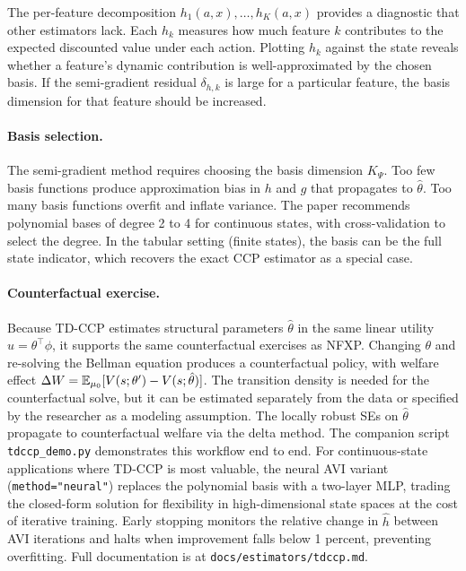 \documentclass[11pt]{article}
\begin{document}
The per-feature decomposition $h_1(a,x), \ldots, h_K(a,x)$ provides a diagnostic that other estimators lack.
Each $h_k$ measures how much feature $k$ contributes to the expected discounted value under each action.
Plotting $h_k$ against the state reveals whether a feature's dynamic contribution is well-approximated by the chosen basis.
If the semi-gradient residual $\delta_{h,k}$ is large for a particular feature, the basis dimension for that feature should be increased.

\paragraph{Basis selection.}
The semi-gradient method requires choosing the basis dimension $K_\Psi$.
Too few basis functions produce approximation bias in $h$ and $g$ that propagates to $\hat\theta$.
Too many basis functions overfit and inflate variance.
The paper recommends polynomial bases of degree 2 to 4 for continuous states, with cross-validation to select the degree.
In the tabular setting (finite states), the basis can be the full state indicator, which recovers the exact CCP estimator as a special case.

\paragraph{Counterfactual exercise.}
Because TD-CCP estimates structural parameters $\hat\theta$ in the same linear utility $u = \theta^\top\phi$, it supports the same counterfactual exercises as NFXP.
Changing $\theta$ and re-solving the Bellman equation produces a counterfactual policy, with welfare effect $\Delta W = \mathbb{E}_{\mu_0}[V(s;\theta') - V(s;\hat\theta)]$.
The transition density is needed for the counterfactual solve, but it can be estimated separately from the data or specified by the researcher as a modeling assumption.
The locally robust SEs on $\hat\theta$ propagate to counterfactual welfare via the delta method.
The companion script \texttt{tdccp\_demo.py} demonstrates this workflow end to end.
For continuous-state applications where TD-CCP is most valuable, the neural AVI variant (\texttt{method="neural"}) replaces the polynomial basis with a two-layer MLP, trading the closed-form solution for flexibility in high-dimensional state spaces at the cost of iterative training.
Early stopping monitors the relative change in $\hat h$ between AVI iterations and halts when improvement falls below 1 percent, preventing overfitting.
Full documentation is at \texttt{docs/estimators/tdccp.md}.
\end{document}
